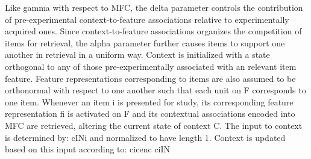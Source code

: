{}Like \markdownRendererDollarSign{}\markdownRendererBackslash{}gamma\markdownRendererDollarSign{} with respect to \markdownRendererDollarSign{}M\markdownRendererCircumflex{}\markdownRendererLeftBrace{}FC\markdownRendererRightBrace{}\markdownRendererDollarSign{}, the \markdownRendererDollarSign{}\markdownRendererBackslash{}delta\markdownRendererDollarSign{} parameter controls the contribution of pre-experimental context-to-feature associations relative to experimentally acquired ones. Since context-to-feature associations organizes the competition of items for retrieval, the \markdownRendererDollarSign{}\markdownRendererBackslash{}alpha\markdownRendererDollarSign{} parameter further causes items to support one another in retrieval in a uniform way.\markdownRendererInterblockSeparator
{}Context is initialized with a state orthogonal to any of those pre-experimentally associated with an relevant item feature. Feature representations corresponding to items are also assumed to be orthonormal with respect to one another such that each unit on \markdownRendererDollarSign{}F\markdownRendererDollarSign{} corresponds to one item.\markdownRendererInterblockSeparator
{}\markdownRendererInterblockSeparator
{}Whenever an item \markdownRendererDollarSign{}i\markdownRendererDollarSign{} is presented for study, its corresponding feature representation \markdownRendererDollarSign{}f\markdownRendererUnderscore{}i\markdownRendererDollarSign{} is activated on \markdownRendererDollarSign{}F\markdownRendererDollarSign{} and its contextual associations encoded into \markdownRendererDollarSign{}M\markdownRendererCircumflex{}\markdownRendererLeftBrace{}FC\markdownRendererRightBrace{}\markdownRendererDollarSign{} are retrieved, altering the current state of context \markdownRendererDollarSign{}C\markdownRendererDollarSign{}.\markdownRendererInterblockSeparator
{}The input to context is determined by:\markdownRendererInterblockSeparator
{}\markdownRendererDollarSign{}\markdownRendererDollarSign{}c\markdownRendererCircumflex{}\markdownRendererLeftBrace{}IN\markdownRendererRightBrace{}\markdownRendererLeftBrace{}i\markdownRendererRightBrace{}\markdownRendererDollarSign{}\markdownRendererDollarSign{}\markdownRendererInterblockSeparator
{}and normalized to have length 1. Context is updated based on this input according to:\markdownRendererInterblockSeparator
{}\markdownRendererDollarSign{}\markdownRendererDollarSign{}cic\markdownRendererLeftBrace{}enc\markdownRendererRightBrace{} c\markdownRendererUnderscore{}\markdownRendererLeftBrace{}i\markdownRendererRightBrace{}\markdownRendererCircumflex{}\markdownRendererLeftBrace{}IN\markdownRendererRightBrace{}\markdownRendererDollarSign{}\markdownRendererDollarSign{}\markdownRendererInterblockSeparator
